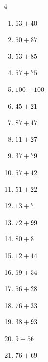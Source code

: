 \begin{multicols}{4}
\begin{enumerate}
  \item $63+40$
        \phantom{$=103$}

  \item $60+87$
        \phantom{$=147$}

  \item $53+85$
        \phantom{$=138$}

  \item $57+75$
        \phantom{$=132$}

  \item $100+100$
        \phantom{$=200$}

\columnbreak %

  \item $45+21$
        \phantom{$=66$}

  \item $87+47$
        \phantom{$=134$}

  \item $11+27$
        \phantom{$=38$}

  \item $37+79$
        \phantom{$=116$}

  \item $57+42$
        \phantom{$=99$}

  \item $51+22$
        \phantom{$=73$}

  \item $13+7$
        \phantom{$=20$}

  \item $72+99$
        \phantom{$=171$}

  \item $80+8$
        \phantom{$=88$}

  \item $12+44$
        \phantom{$=56$}

  \item $59+54$
        \phantom{$=113$}

  \item $66+28$
        \phantom{$=94$}

  \item $76+33$
        \phantom{$=109$}

  \item $38+93$
        \phantom{$=131$}

  \item $9+56$
        \phantom{$=65$}

  \item $76+69$
        \phantom{$=145$}


\end{enumerate}
\end{multicols}
